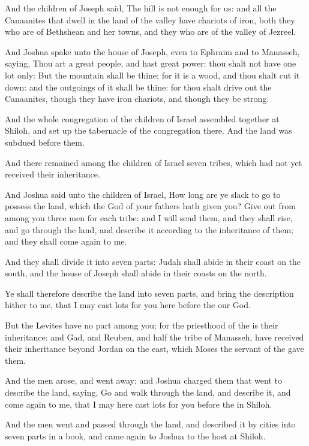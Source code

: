 \Verse And the children of Joseph said, The hill is not enough for us: and all the Canaanites that dwell in the land of the valley have chariots of iron, both they who are of Bethshean and her towns, and they who are of the valley of Jezreel.

\Verse And Joshua spake unto the house of Joseph, even to Ephraim and to Manasseh, saying, Thou art a great people, and hast great power: thou shalt not have one lot only: \Verse But the mountain shall be thine; for it is a wood, and thou shalt cut it down: and the outgoings of it shall be thine: for thou shalt drive out the Canaanites, though they have iron chariots, and though they be strong.


\Chapter
\Verse And the whole congregation of the children of Israel assembled together at Shiloh, and set up the tabernacle of the congregation there. And the land was subdued before them.

\Verse And there remained among the children of Israel seven tribes, which had not yet received their inheritance.

\Verse And Joshua said unto the children of Israel, How long are ye slack to go to possess the land, which the \LORD God of your fathers hath given you?  \Verse Give out from among you three men for each tribe: and I will send them, and they shall rise, and go through the land, and describe it according to the inheritance of them; and they shall come again to me.

\Verse And they shall divide it into seven parts: Judah shall abide in their coast on the south, and the house of Joseph shall abide in their coasts on the north.

\Verse Ye shall therefore describe the land into seven parts, and bring the description hither to me, that I may cast lots for you here before the \LORD our God.

\Verse But the Levites have no part among you; for the priesthood of the \LORD is their inheritance: and Gad, and Reuben, and half the tribe of Manasseh, have received their inheritance beyond Jordan on the east, which Moses the servant of the \LORD gave them.

\Verse And the men arose, and went away: and Joshua charged them that went to describe the land, saying, Go and walk through the land, and describe it, and come again to me, that I may here cast lots for you before the \LORD in Shiloh.

\Verse And the men went and passed through the land, and described it by cities into seven parts in a book, and came again to Joshua to the host at Shiloh.

